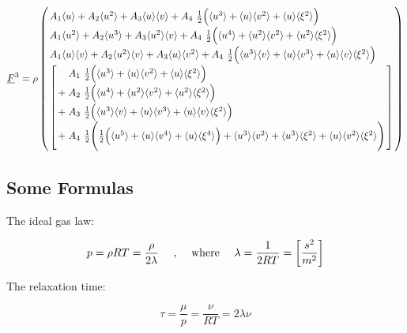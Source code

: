 \documentclass[
	pdftex,             %
	12pt,				%
	a4paper,		   	%
	english,				%
	oneside,			%
]{article}
\newcommand{\mom}[1]{\langle #1 \rangle}
\newcommand{\uu}[1]{\underline{#1}}
\begin{document}

\begin{equation}
\arraycolsep=1.4pt\def\arraystretch{1.5}
\uu{F}^3
=
\rho
\left(
\begin{array}{l}
    A_1 \mom{u} + 
    A_2 \mom{u^2} + 
    A_3 \mom{u}\mom{v}+ 
    A_4 ~\tfrac{1}{2} \Big( \mom{u^3} + \mom{u}\mom{v^2} + \mom{u}\mom{\xi^2} \Big)
\\
    A_1 \mom{u^2} + 
    A_2 \mom{u^3} + 
    A_3 \mom{u^2}\mom{v}+ 
    A_4 ~\tfrac{1}{2} \Big( \mom{u^4} + \mom{u^2}\mom{v^2} + \mom{u^2}\mom{\xi^2} \Big)
\\
    A_1 \mom{u}\mom{v} + 
    A_2 \mom{u^2}\mom{v} + 
    A_3 \mom{u}\mom{v^2}+ 
    A_4 ~\tfrac{1}{2} \Big( \mom{u^3}\mom{v} + \mom{u}\mom{v^3} + \mom{u}\mom{v}\mom{\xi^2} \Big)
\\
\left[
\begin{array}{ll}
  &	A_1 ~\tfrac{1}{2} \Big( \mom{u^3} + \mom{u}\mom{v^2} + \mom{u}\mom{\xi^2} \Big) \\
+ &	A_2 ~\tfrac{1}{2} \Big( \mom{u^4} + \mom{u^2}\mom{v^2} + \mom{u^2}\mom{\xi^2} \Big) \\
+ & A_3 ~\tfrac{1}{2} \Big( \mom{u^3}\mom{v} + \mom{u}\mom{v^3} + \mom{u}\mom{v}\mom{\xi^2} \Big) \\
+ & A_4 ~\tfrac{1}{2} \Bigg( \tfrac{1}{2} \Big( \mom{u^5} + \mom{u}\mom{v^4} + \mom{u}\mom{\xi^4} \Big)
						  + \mom{u^3}\mom{v^2} + \mom{u^3}\mom{\xi^2} + \mom{u}\mom{v^2}\mom{\xi^2} \Bigg)
\end{array}
\right]
\end{array}
\right)
\end{equation}

\clearpage
\subsection{Some Formulas}

The ideal gas law:

\begin{equation}
p = \rho RT = \dfrac{\rho}{2 \lambda}
\textnormal{~~~~,~~~~where~~~~}
\lambda = \frac{1}{2RT} = \left[ \dfrac{s^2}{m^2} \right]
\end{equation}

The relaxation time:

\begin{equation}
\tau = \frac{\mu}{p} = \frac{\nu}{RT} = 2\lambda\nu
\end{equation}
\end{document}

